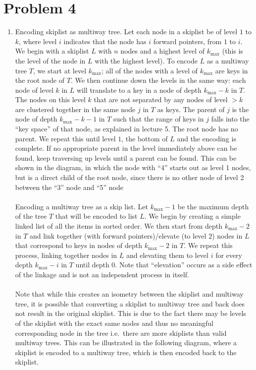 \documentclass{article}
\theoremstyle{casestyle}
\begin{document}
\section *{Problem 4}
\begin{enumerate}[i]
\item Encoding skiplist as multiway tree. Let each node in a skiplist be of level $1$ to $k$, where level $i$ indicates that the node has $i$ forward pointers, from $1$ to $i$. We begin with a skiplist $L$ with $n$ nodes and a highest level of $k_{\max}$ (this is the level of the node in $L$ with the highest level). To encode $L$ as a multiway tree $T$, we start at level $k_{\max}$; all of the nodes with a level of $k_{\max}$ are keys in the root node of $T$. We then continue down the levels in the same way: each node of level $k$ in $L$ will translate to a key in a node of depth $k_{\max}-k$ in $T$. The nodes on this level $k$ that are not separated by any nodes of level $>k$ are clustered together in the same node $j$ in $T$ as keys. The parent of $j$ is the node of depth $k_{\max}-k-1$ in $T$ such that the range of keys in $j$ falls into the ``key space'' of that node, as explained in lecture 5. The root node has no parent. We repeat this until level $1$, the bottom of $L$ and the encoding is complete. If no appropriate parent in the level immediately above can be found, keep traversing up levels until a parent can be found. This can be shown in the diagram, in which the node with ``4'' starts out as level 1 nodes, but is a direct child of the root node, since there is no other node of level 2 between the ``3'' node and ``5'' node \\\\
Encoding a multiway tree as a skip list. Let $k_{\max}-1$ be the maximum depth of the tree $T$ that will be encoded to list $L$. We begin by creating a simple linked list of all the items in sorted 
order. We then start from depth $k_{\max}-2$ in $T$ and link together (with forward pointers)/elevate (to level $2$) nodes in $L$ that correspond to keys in nodes of depth $k_{\max}-2$  in $T$. We repeat this process, linking together nodes in $L$ and elevating them to level $i$ for every depth $k_{\max}-i$ in $T$ until depth $0$. Note that ``elevation'' occurs as a side effect of the linkage and is not an independent process in itself.
\\\\
Note that while this creates an isometry between the skiplist and multiway tree, it is possible that converting a skiplist to multiway tree and back does not result in the original skiplist. This is due to the fact there may be levels of the skiplist with the exact same nodes and thus no meaningful corresponding node in the tree i.e.\ there are more skiplists than valid multiway trees. This can be illustrated in the following diagram, where a skiplist is encoded to a multiway tree, which is then encoded back to the skiplist.


\end{enumerate}
\end{document}
